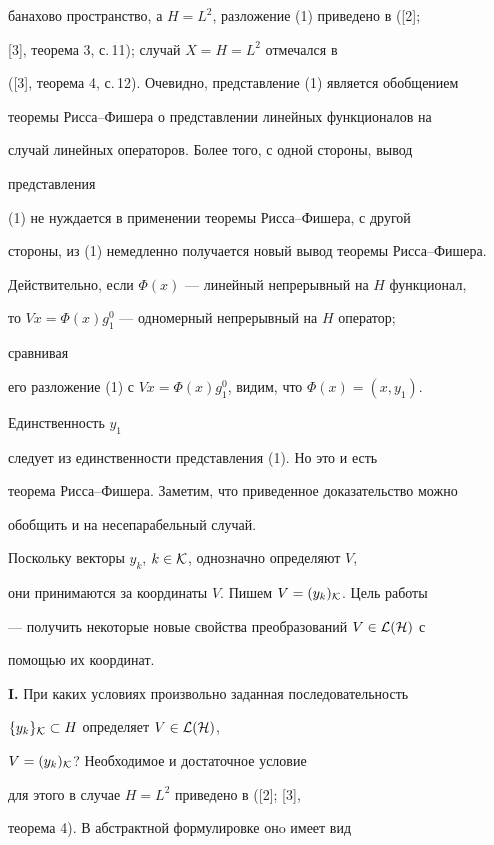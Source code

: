 банахово пространство, а $H=L^2$, разложение (1) приведено в ([2];


[3], теорема 3, с.\,11); случай $X=H=L^2$ отмечался в 


([3], теорема 4, с.\,12). Очевидно, представление (1) является обобщением 


теоремы Рисса--Фишера о представлении линейных функционалов на 


случай линейных операторов. Более того, с одной стороны, вывод 


представления 


(1) не нуждается в применении теоремы Рисса--Фишера, с другой 


стороны, из (1) немедленно получается новый вывод теоремы Рисса--Фишера. 


Действительно, если $\Phi(x)$ --- линейный непрерывный на $H$ функционал, 


то $V x=\Phi(x)g^0_1$ --- одномерный непрерывный на $H$ оператор; 


сравнивая 


его разложение (1) с $V x=\Phi(x)g^0_1$, видим, что $\Phi(x)=(x,y_1)$. 


Единственность $y_1$ 


следует из единственности представления (1). Но это и есть 


теорема Рисса--Фишера. Заметим, что приведенное доказательство можно 


обобщить и на несепарабельный случай. 


 


Поскольку векторы $y_k$, $k\in\cal K$, однозначно определяют $V$, 


они принимаются за координаты $V$. Пишем $V=(y_k)_{\cal K}$. Цель работы 


--- получить некоторые новые свойства преобразований $V\in\cal L(H)$ с 


помощью их координат. 


\medskip 


 


{\bf I.} При каких условиях произвольно заданная последовательность 


$\{y_k\}_{\cal K}\subset H$ определяет $V\in\cal L(H)$, 


$V=(y_k)_{\cal K}$? Необходимое и достаточное условие 


для этого в случае $H=L^2$ приведено в ([2]; [3], 


теорема 4). В абстрактной формулировке онo имеет вид 



